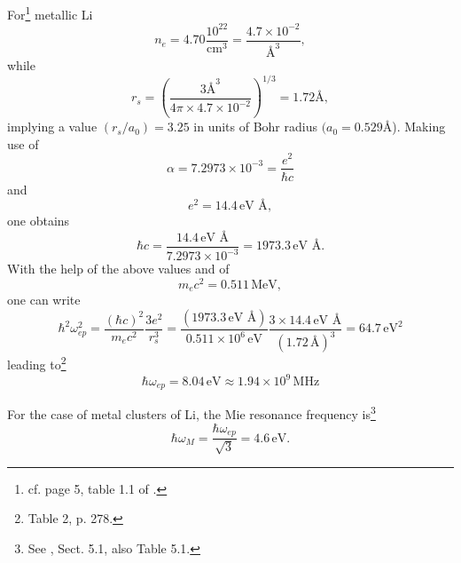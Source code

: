 For\footnote{cf. page 5, table 1.1 of \cite{Ashcroft:87}.} metallic Li
\begin{equation}
n_e=4.70\frac{10^{22}}{\text{cm}^3}=\frac{4.7\times10^{-2}}{\text{\AA{}}^3},
\end{equation}
while
\begin{equation}
r_s=\left(\frac{3\text{\AA}^3}{4\pi\times4.7\times10^{-2}}\right)^{1/3}=1.72\text{\AA},
\end{equation}
implying a value $(r_s/a_0)=3.25$ in units of  Bohr radius $(a_0=0.529$\AA).
Making use of 
\begin{equation}
\alpha=7.2973\times10^{-3}=\frac{e^2}{\hbar c}
\end{equation}
and
\begin{equation}
e^2=14.4\,\text{eV \AA},
\end{equation}
one obtains
\begin{equation}
\hbar c=\frac{14.4\,\text{eV \AA}}{7.2973\times10^{-3}}=1973.3\,\text{eV \AA}.
\end{equation}
With the help of the above values and of
\begin{equation}
m_ec^2=0.511\,\text{MeV},
\end{equation}
one can write
\begin{equation}
\hbar^2\omega^2_{ep}=\frac{(\hbar c)^2}{m_e c^2}\frac{3e^2}{r_s^3}=\frac{(1973.3\,\text{eV \AA})}{0.511\times10^6\,\text{eV}}\frac{3\times14.4\,\text{eV \AA}}{(1.72\,\text{\AA})^3}=64.7\,\text{eV}^2
\end{equation}
leading to\footnote{\cite{Kittel:96} Table 2, p. 278.}
\begin{equation}
\hbar\omega_{ep}=8.04\,\text{eV}\approx 1.94\times 10^9\,\text{MHz}
\end{equation}


For the case of metal clusters of Li, the Mie resonance frequency is\footnote{See \cite{Bertsch:05}, Sect. 5.1, also Table 5.1.}
\begin{equation}
\hbar\omega_M=\frac{\hbar\omega_{ep}}{\sqrt{3}}=4.6\,\text{eV}.
\end{equation}
